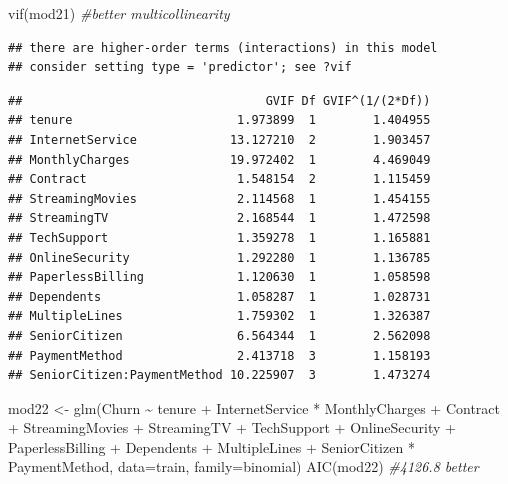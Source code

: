 \documentclass[
  twoside]{article}
\newenvironment{Shaded}{\begin{snugshade}}{\end{snugshade}}
\newcommand{\AttributeTok}[1]{\textcolor[rgb]{0.77,0.63,0.00}{#1}}
\newcommand{\CommentTok}[1]{\textcolor[rgb]{0.56,0.35,0.01}{\textit{#1}}}
\newcommand{\FunctionTok}[1]{\textcolor[rgb]{0.00,0.00,0.00}{#1}}
\newcommand{\NormalTok}[1]{#1}
\newcommand{\OtherTok}[1]{\textcolor[rgb]{0.56,0.35,0.01}{#1}}
\newcommand{\SpecialCharTok}[1]{\textcolor[rgb]{0.00,0.00,0.00}{#1}}
\begin{document}
\begin{Shaded}
\begin{Highlighting}[]
\FunctionTok{vif}\NormalTok{(mod21) }\CommentTok{\#better multicollinearity}
\end{Highlighting}
\end{Shaded}

\begin{verbatim}
## there are higher-order terms (interactions) in this model
## consider setting type = 'predictor'; see ?vif
\end{verbatim}

\begin{verbatim}
##                                  GVIF Df GVIF^(1/(2*Df))
## tenure                       1.973899  1        1.404955
## InternetService             13.127210  2        1.903457
## MonthlyCharges              19.972402  1        4.469049
## Contract                     1.548154  2        1.115459
## StreamingMovies              2.114568  1        1.454155
## StreamingTV                  2.168544  1        1.472598
## TechSupport                  1.359278  1        1.165881
## OnlineSecurity               1.292280  1        1.136785
## PaperlessBilling             1.120630  1        1.058598
## Dependents                   1.058287  1        1.028731
## MultipleLines                1.759302  1        1.326387
## SeniorCitizen                6.564344  1        2.562098
## PaymentMethod                2.413718  3        1.158193
## SeniorCitizen:PaymentMethod 10.225907  3        1.473274
\end{verbatim}

\begin{Shaded}
\begin{Highlighting}[]
\NormalTok{mod22 }\OtherTok{\textless{}{-}} \FunctionTok{glm}\NormalTok{(Churn }\SpecialCharTok{\textasciitilde{}}\NormalTok{ tenure }\SpecialCharTok{+}\NormalTok{ InternetService }\SpecialCharTok{*}\NormalTok{ MonthlyCharges }\SpecialCharTok{+}\NormalTok{ Contract }\SpecialCharTok{+}\NormalTok{ StreamingMovies }\SpecialCharTok{+}\NormalTok{ StreamingTV }\SpecialCharTok{+}\NormalTok{ TechSupport }\SpecialCharTok{+}\NormalTok{ OnlineSecurity }\SpecialCharTok{+}\NormalTok{ PaperlessBilling }\SpecialCharTok{+}\NormalTok{ Dependents }\SpecialCharTok{+}\NormalTok{ MultipleLines }\SpecialCharTok{+}\NormalTok{ SeniorCitizen }\SpecialCharTok{*}\NormalTok{ PaymentMethod, }\AttributeTok{data=}\NormalTok{train, }\AttributeTok{family=}\NormalTok{binomial)}
\FunctionTok{AIC}\NormalTok{(mod22) }\CommentTok{\#4126.8 better}
\end{Highlighting}
\end{Shaded}
\end{document}
